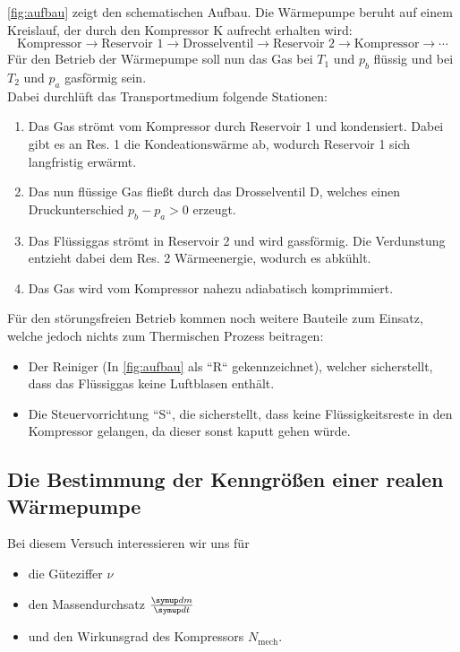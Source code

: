 \autoref{fig:aufbau} zeigt den schematischen Aufbau. Die W\"armepumpe beruht auf einem Kreislauf,
der durch den Kompressor K aufrecht erhalten wird:
\begin{equation}
	\text{Kompressor}
	\rightarrow
	\text{Reservoir 1}
	\rightarrow
	\text{Drosselventil}
	\rightarrow
	\text{Reservoir 2}
	\rightarrow
	\text{Kompressor}
	\rightarrow
	\cdots
	\label{eqn:kreislauf}
\end{equation}
F\"ur den Betrieb der W\"armepumpe soll nun das Gas bei $T_1$ und $p_b$ fl\"ussig und 
bei $T_2$ und $p_a$ gasf\"ormig sein.
\\
Dabei durchl\"uft das Transportmedium folgende Stationen:
\begin{enumerate}
	\item Das Gas str\"omt vom Kompressor durch Reservoir 1 und kondensiert. Dabei gibt es an
		Res. 1 die Kondeationsw\"arme ab, wodurch Reservoir 1 sich langfristig erw\"armt.
	\item Das nun fl\"ussige Gas flie\ss t durch das Drosselventil D, welches einen Druckunterschied
		$p_b - p_a > 0$ erzeugt.
	\item Das Fl\"ussiggas str\"omt in Reservoir 2 und wird gassf\"ormig. Die Verdunstung entzieht 
		dabei dem Res. 2 W\"armeenergie, wodurch es abk\"uhlt.
	\item Das Gas wird vom Kompressor nahezu adiabatisch komprimmiert.
\end{enumerate}

F\"ur den st\"orungsfreien Betrieb kommen noch weitere Bauteile zum Einsatz, welche jedoch nichts zum
Thermischen Prozess beitragen:
\begin{itemize}
	\item Der Reiniger (In \autoref{fig:aufbau} als ``R`` gekennzeichnet), welcher sicherstellt,
		dass das Fl\"ussiggas keine Luftblasen enth\"alt.
	\item Die Steuervorrichtung ``S``, die sicherstellt, dass keine Fl\"ussigkeitsreste in den 
		Kompressor gelangen, da dieser sonst kaputt gehen w\"urde.
\end{itemize}


\subsection{Die Bestimmung der Kenngrößen einer realen
Wärmepumpe}
\label{sec:bestimmung-kenngroessen}

Bei diesem Versuch interessieren wir uns f\"ur
\begin{itemize}
	\item die G\"uteziffer $\nu$
	\item den Massendurchsatz $\frac{\symup d m}{\symup d t}$
	\item und den Wirkunsgrad des Kompressors  $N_\text{mech}$.
\end{itemize}

